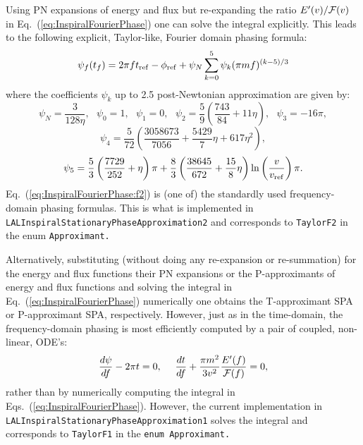 Using PN expansions of energy and flux but
re-expanding the ratio $E'(v)/{\cal F}(v)$ in Eq.~(\ref{eq:InspiralFourierPhase}) one
can solve the integral explicitly. This leads to the following
explicit, Taylor-like, Fourier domain phasing formula:
\begin{equation}
 \psi_f(t_f) = 2 \pi f t_{\rm ref} - \phi_{\rm ref} + 
 \psi_N \sum_{k=0}^5 {\psi}_k (\pi m f)^{(k-5)/3} 
\label{eq:InspiralFourierPhase:f2}
\end{equation}
where the coefficients ${\psi}_k$ up to 2.5 post-Newtonian approximation are given by:
$$\psi_N =  \frac{3}{128\eta},\ \ \ \psi_0 = 1,\ \ \ \psi_1 = 0,\ \ \   
\psi_2 =  \frac{5}{9} \left ( \frac{743}{84} + 11\eta\right ),\ \ \ 
\psi_3 =  -16\pi,$$
$$\psi_4 = \frac{5}{72}\left(\frac{3058673}{7056} + \frac{5429}{7}\eta + 
617\eta^2\right),$$
$$\psi_5 =  \frac{5}{3} \left ( \frac{7729}{252} + \eta \right ) \pi +
   \frac{8}{3} \left ( \frac{38645}{672} + \frac{15}{8} \eta \right ) 
	\ln \left ( \frac{v}{v_{\rm ref}} \right )\pi.$$
Eq.~(\ref{eq:InspiralFourierPhase:f2}) is (one of) the  standardly used frequency-domain phasing formulas.
This is what is implemented in {\tt LALInspiralStationaryPhaseApproximation2}
and corresponds to \texttt{TaylorF2} in the enum \texttt{Approximant.}

Alternatively, substituting (without doing any re-expansion or re-summation) 
for the energy and flux functions their PN expansions
or the P-approximants of energy and flux functions 
and solving the integral in Eq.~(\ref{eq:InspiralFourierPhase}) numerically
one obtains the T-approximant SPA or P-approximant SPA, respectively.
However, just as in the time-domain, the frequency-domain phasing is 
most efficiently computed by a pair of coupled, non-linear, ODE's:
\begin{equation}
\frac{d\psi}{df} - 2\pi t = 0, \ \ \ \
\frac{dt}{df} + \frac{\pi m^2}{3v^2} \frac{E'(f)}{{\cal F}(f)} = 0,
\label {eq:frequencyDomainODE}
\end{equation}
rather  than by numerically computing the integral in  
Eqs.~(\ref{eq:InspiralFourierPhase}).  However, the current implementation 
in {\tt LALInspiralStationaryPhaseApproximation1} solves the integral 
and corresponds to \texttt{TaylorF1} in the  \texttt{enum Approximant.}

